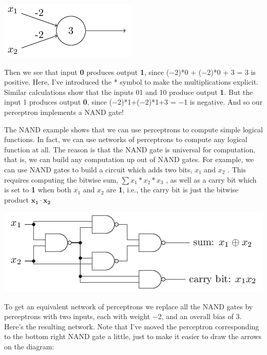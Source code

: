 \documentclass[a4paper,12pt]{report}%
\begin{document}
\begin{center}
 \includegraphics[width=0.7\linewidth]{images/tikz2.png}
\end{center}

Then we see that input \textbf{0} produces output \textbf{1}, since (−2)*0 + (−2)*0 + 3 = 3 is positive. Here, I've introduced the * symbol to make the multiplications explicit. Similar calculations show that the inputs 01 and 10 produce output \textbf{1}. But the input 1 produces output \textbf{0}, since (−2)*1+(−2)*1+3 = −1 is negative. And so our perceptron implements a NAND gate!


The NAND example shows that we can use perceptrons to compute simple logical functions. In fact, we can use networks of perceptrons to compute any logical function at all. The reason is that the NAND gate is universal for computation, that is, we can build any computation up out of NAND gates. For example, we can use NAND gates to build a circuit which adds two bits, $x_{1}$  and $x_{2}$ . This requires computing the bitwise sum, $\sum x_{1}*x_{2}*x_{3}$ , as well as a carry bit which is set to \textbf{1} when both $x_{1}$ and $x_{2}$ are \textbf{1}, i.e., the carry bit is just the bitwise product $\mathbf{x_{1}} \cdot \mathbf{x_{2}}$


\begin{center}
 \includegraphics[width=1.0\linewidth]{images/tikz3.png}
\end{center}

To get an equivalent network of perceptrons we replace all the NAND gates by perceptrons with two inputs, each with weight −2, and an overall bias of 3. Here's the resulting network. Note that I've moved the perceptron corresponding to the bottom right NAND gate a little, just to make it easier to draw the arrows on the diagram:
\end{document}
